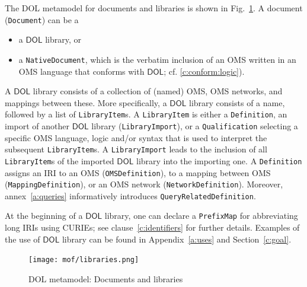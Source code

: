 \documentclass[10pt, a4paper]{isov2}
\makeatletter
\newcommand*{\cf}{cf.\@\xspace}
\newcommand*{\termref}[1]{\index{#1}#1\xspace}
\newcommand*{\syntax}[1]{\texttt{#1}}
\newcommand*{\DOL}{\ensuremath{\mathsf{DOL}}\xspace}
\renewcommand{\clauserefname}{clause}
\renewcommand{\cref}[1]{\clauserefname~\ref{#1}}
\makeatother
\begin{document}
The DOL metamodel for documents and libraries is shown in Fig.~\ref{fig:libraries}.
A \termref{document} (\syntax{Document}) can be a 
\begin{itemize}
\item a \DOL library, or
\item a \syntax{NativeDocument}, which is the verbatim inclusion of an
  OMS written in an OMS language that conforms with \DOL; \cf
  \ref{c:conform:logic}).
\end{itemize}
A \DOL library consists of a collection of (named)  OMS,  OMS networks, and mappings between these.  More specifically, a \DOL
library consists of a name, followed by a list of
\syntax{LibraryItem}s.  A \syntax{LibraryItem} is either a
\syntax{Definition},
an import of another \DOL library (\syntax{LibraryImport}),
or a \syntax{Qualification} selecting a specific
OMS language, logic and/or syntax that is used to interpret the
subsequent \syntax{LibraryItem}s.  
 A \syntax{LibraryImport} leads to the inclusion of all \syntax{LibraryItem}s of the imported \DOL library into the importing one.
A \syntax{Definition} assigns an IRI to an OMS  (\syntax{OMSDefinition}), 
to a mapping between OMS (\syntax{MappingDefinition}), or
an OMS network  (\syntax{NetworkDefinition}). Moreover, annex~\ref{a:queries}
informatively introduces \syntax{QueryRelatedDefinition}.

At the beginning of a \DOL library, one can declare a \syntax{PrefixMap} for abbreviating long IRIs  using CURIEs; see \cref{c:identifiers} for further details. Examples of the use of \DOL library can be found in Appendix~\ref{a:uses} and Section~\ref{c:goal}.

\medskip
\begin{figure}
  \centering
    \texttt{[image: mof/libraries.png]}
  \caption{DOL metamodel: Documents and libraries}
  \label{fig:libraries}
\end{figure}


\vspace{-2em}
\end{document}
